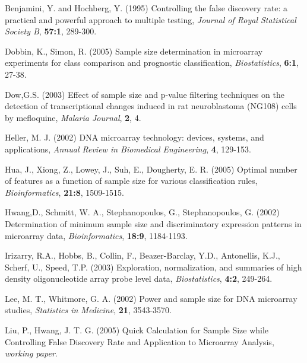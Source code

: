 \documentclass[12pt]{article}
\begin{document}

\begin{thebibliography}{}

 Benjamini, Y.
  and Hochberg, Y. (1995) Controlling the false discovery rate: a
  practical and powerful approach to multiple testing, {\it Journal
  of Royal Statistical Society B}, {\bf 57:1}, 289-300.

 Dobbin, K., Simon, R. (2005)
  Sample size determination in microarray experiments for class comparison and prognostic classification,
  {\it Biostatistics}, {\bf 6:1}, 27-38.

 Dow,G.S. (2003) Effect of sample size
  and p-value filtering techniques on the detection of
  transcriptional changes induced in rat neuroblastoma (NG108) cells
  by mefloquine, {\it Malaria Journal}, {\bf 2}, 4.

 Heller, M. J. (2002) {DNA
  microarray technology: devices, systems, and applications}, {\it
  Annual Review in Biomedical Engineering}, {\bf 4}, 129-153.

 Hua, J., Xiong, Z., Lowey, J., Suh, E., Dougherty, E. R. (2005)
  Optimal number of features as a function of sample size for various classification rules,
  {\it Bioinformatics}, {\bf 21:8}, 1509-1515.

 Hwang,D., Schmitt,
  W. A., Stephanopoulos, G., Stephanopoulos, G. (2002) Determination
  of minimum sample size and discriminatory expression patterns in
  microarray data, {\it Bioinformatics}, {\bf 18:9}, 1184-1193.

 Irizarry, R.A.,
  Hobbs, B., Collin, F., Beazer-Barclay, Y.D., Antonellis, K.J.,
  Scherf, U., Speed, T.P. (2003) Exploration, normalization, and
  summaries of high density oligonucleotide array probe level data,
  {\it Biostatistics}, {\bf 4:2}, 249-264.

 Lee, M. T., Whitmore, G. A. (2002)
  Power and sample size for DNA microarray studies, {\it Statistics in Medicine}, {\bf 21}, 3543-3570.

 Liu, P., Hwang, J. T. G. (2005)
  Quick Calculation for Sample Size while Controlling False Discovery Rate and Application to Microarray Analysis,
  {\it working paper}.


\end{thebibliography}
\end{document}

